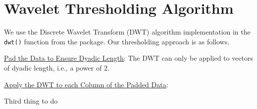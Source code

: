 \section{Wavelet Thresholding Algorithm}

We use the Discrete Wavelet Transform (DWT) algorithm implementation in the \texttt{dwt()} function from the   package.
Our thresholding approach is as follows.

\begin{steps}
  \item \underline{Pad the Data to Ensure Dyadic Length}: The DWT can only be applied to vectors of dyadic length, i.e., a power of $2$.
  \item \underline{Apply the DWT to each Column of the Padded Data}:
  \item Third thing to do
\end{steps}
